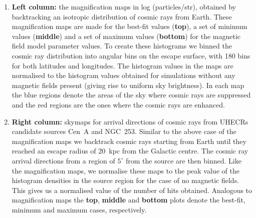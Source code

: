 \documentclass[usenatbib]{mnras}
\newcommand{\Arjen}[1]{{\color{brown}#1}}
\begin{document}
\begin{enumerate}
    \item {\bf Left column: } the magnification maps in log (particles/str), obtained by backtracking an isotropic distribution of cosmic rays from Earth. These magnification maps are made for the best-fit values (\textbf{top}), a set of minimum values (\textbf{middle}) and a set of maximum values (\textbf{bottom}) for the magnetic field model parameter values.
    To create these histograms we binned the cosmic ray distribution into angular bins on the escape surface, with 180 bins for both latitudes and longitudes. The histogram values in the maps are normalised to the histogram values obtained for simulations without any magnetic fields present (giving rise to uniform sky brightness). In each map the blue regions denote the areas of the sky where cosmic rays are suppressed and the red regions are the ones where the cosmic rays are enhanced.
    
    \item {\bf Right column: } skymaps for arrival directions
    of cosmic rays from UHECRs candidate sources Cen~A and NGC~253. Similar to the above case of the magnification maps we backtrack cosmic rays starting from Earth until they reached an escape radius of 20~kpc from the Galactic centre. The cosmic ray arrival directions from a region of $5^{\circ}$ from the source are then binned.  Like the magnification maps, we normalise these maps to the peak value of the histogram densities in the source region for the case of no magnetic fields.  This gives us a normalised value of the number of hits obtained. Analogous to magnification maps the \textbf{top}, \textbf{middle} and \textbf{bottom} plots denote the best-fit, minimum and maximum cases, respectively. 
    \end{enumerate}



    
\end{document}
